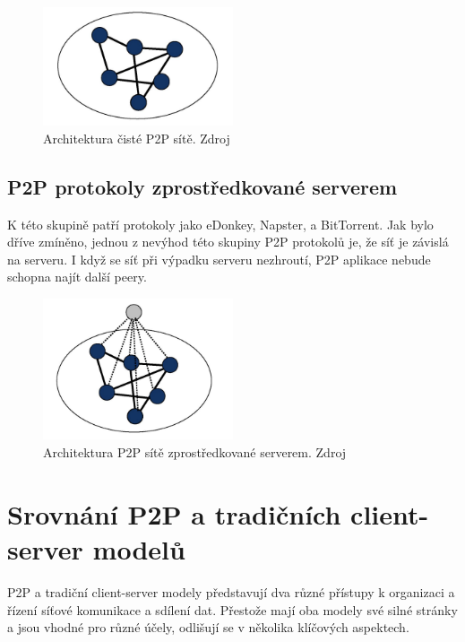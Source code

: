 \documentclass[10pt,twoside,czech,a4paper]{article}
\begin{document}
\begin{figure}[H]
	\centering
	\includegraphics[width=0.5\textwidth]{pure-p2p.png}
	\caption{Architektura čisté P2P sítě. Zdroj \cite{Leong2007}}
	\label{fig:pure-p2p}
\end{figure}
	

\subsection{P2P protokoly zprostředkované serverem}

K této skupině patří protokoly jako eDonkey, Napster, a BitTorrent.
Jak bylo dříve zmíněno, jednou z nevýhod této skupiny P2P protokolů je, že síť je závislá na serveru.
I když se síť při výpadku serveru nezhroutí, P2P aplikace nebude schopna najít další peery\cite{Lui2002}.

\begin{figure}[H]
	\centering
	\includegraphics[width=0.5\textwidth]{server-mediated-p2p.png}
	\caption{Architektura P2P sítě zprostředkované serverem. Zdroj \cite{Leong2007}}
	\label{fig:server-mediated-p2p}
\end{figure}


\section{Srovnání P2P a tradičních client-server modelů}

P2P a tradiční client-server modely představují dva různé přístupy k organizaci a řízení síťové komunikace a sdílení dat.
Přestože mají oba modely své silné stránky a jsou vhodné pro různé účely, odlišují se v několika klíčových aspektech.
\end{document}
